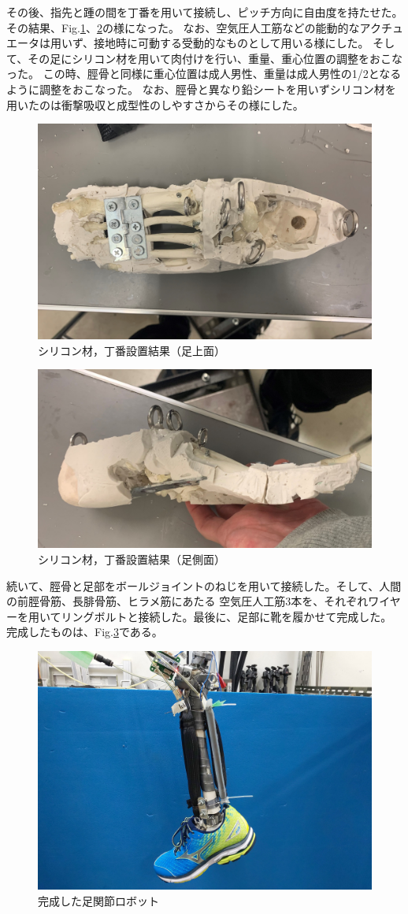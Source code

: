 \newpage
その後、指先と踵の間を丁番を用いて接続し、ピッチ方向に自由度を持たせた。その結果、Fig.\ref{fig:foot2}、\ref{fig:footside2}の様になった。
なお、空気圧人工筋などの能動的なアクチュエータは用いず、接地時に可動する受動的なものとして用いる様にした。
そして、その足にシリコン材を用いて肉付けを行い、重量、重心位置の調整をおこなった。
この時、脛骨と同様に重心位置は成人男性、重量は成人男性の1/2となるように調整をおこなった。
なお、脛骨と異なり鉛シートを用いずシリコン材を用いたのは衝撃吸収と成型性のしやすさからその様にした。
\begin{figure}[h]
    \begin{center}
     \includegraphics[width=0.6\columnwidth,clip]{./2_measurement/siliconfoot.eps}
     \caption{シリコン材，丁番設置結果（足上面）}
     \label{fig:foot2}
    \end{center}
\end{figure}
\begin{figure}[h]
    \begin{center}
     \includegraphics[width=0.6\columnwidth,clip]{./2_measurement/siliconfootside.eps}
     \caption{シリコン材，丁番設置結果（足側面）}
     \label{fig:footside2}
    \end{center}
\end{figure}
\newpage
続いて、脛骨と足部をボールジョイントのねじを用いて接続した。そして、人間の前脛骨筋、長腓骨筋、ヒラメ筋にあたる
空気圧人工筋3本を、それぞれワイヤーを用いてリングボルトと接続した。最後に、足部に靴を履かせて完成した。
完成したものは、Fig.\ref{fig:fin}である。

\begin{figure}[h]
    \begin{center}
     \includegraphics[width=0.6\columnwidth,clip]{./2_measurement/fin.eps}
     \caption{完成した足関節ロボット}
     \label{fig:fin}
    \end{center}
\end{figure}